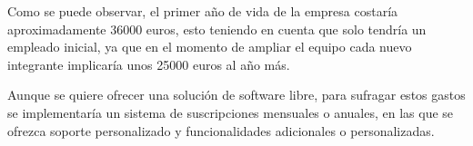 Como se puede observar, el primer año de vida de la empresa costaría aproximadamente 36000 euros, esto teniendo en cuenta que solo tendría un empleado inicial, ya que en el momento de ampliar el equipo cada nuevo integrante implicaría unos 25000 euros al año más.

\smallskip
Aunque se quiere ofrecer una solución de software libre, para sufragar estos gastos se implementaría un sistema de suscripciones mensuales o anuales, en las que se ofrezca soporte personalizado y funcionalidades adicionales o personalizadas.